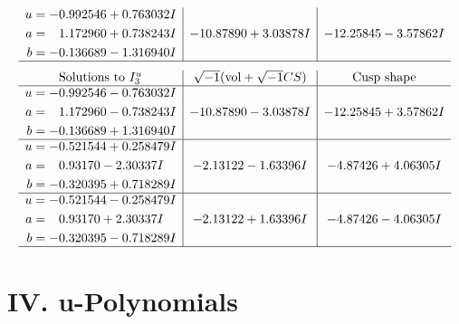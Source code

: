 \documentclass[1p]{elsarticle_modified}
\theoremstyle{definition}
\newcommand{\I}{\sqrt{-1}}
\begin{document}
$$\begin{array}{c|c|c}
\begin{aligned}
u &= -0.992546 + 0.763032 I \\
a &= \phantom{-}1.172960 + 0.738243 I \\
b &= -0.136689 - 1.316940 I\end{aligned}
 & -10.87890 + 3.03878 I & -12.25845 - 3.57862 I\\
 \hline 
 \end{array}$$\newpage$$\begin{array}{c|c|c}  
\text{Solutions to }I^u_{3}& \I (\text{vol} + \sqrt{-1}CS) & \text{Cusp shape}\\
 \hline 
\begin{aligned}
u &= -0.992546 - 0.763032 I \\
a &= \phantom{-}1.172960 - 0.738243 I \\
b &= -0.136689 + 1.316940 I\end{aligned}
 & -10.87890 - 3.03878 I & -12.25845 + 3.57862 I \\ \hline\begin{aligned}
u &= -0.521544 + 0.258479 I \\
a &= \phantom{-}0.93170 - 2.30337 I \\
b &= -0.320395 + 0.718289 I\end{aligned}
 & -2.13122 - 1.63396 I & -4.87426 + 4.06305 I \\ \hline\begin{aligned}
u &= -0.521544 - 0.258479 I \\
a &= \phantom{-}0.93170 + 2.30337 I \\
b &= -0.320395 - 0.718289 I\end{aligned}
 & -2.13122 + 1.63396 I & -4.87426 - 4.06305 I\\
 \hline 
 \end{array}$$\newpage
\newpage\renewcommand{\arraystretch}{1}
\centering \section*{ IV. u-Polynomials}
\end{document}
